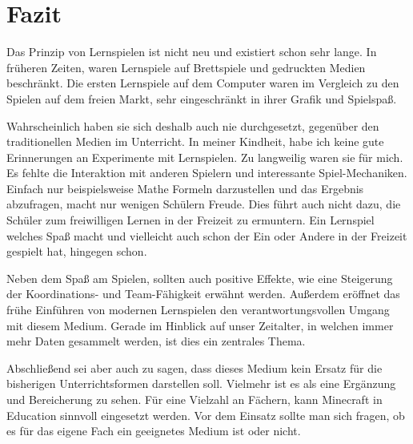 \section{Fazit}
Das Prinzip von Lernspielen ist nicht neu und existiert schon sehr lange. In früheren Zeiten, waren Lernspiele auf Brettspiele und gedruckten Medien beschränkt. Die ersten Lernspiele auf dem Computer waren im Vergleich zu den Spielen auf dem freien Markt, sehr eingeschränkt in ihrer Grafik und Spielspaß. 

Wahrscheinlich haben sie sich deshalb auch nie durchgesetzt, gegenüber den traditionellen Medien im Unterricht.
In meiner Kindheit, habe ich keine gute Erinnerungen an Experimente mit Lernspielen. Zu langweilig waren sie für mich. Es fehlte die Interaktion mit anderen Spielern und interessante Spiel-Mechaniken. Einfach nur beispielsweise Mathe Formeln darzustellen und das Ergebnis abzufragen, macht nur wenigen Schülern Freude. Dies führt auch nicht dazu, die Schüler zum freiwilligen Lernen in der Freizeit zu ermuntern. Ein Lernspiel welches Spaß macht und vielleicht auch schon der Ein oder Andere in der Freizeit gespielt hat, hingegen schon.

Neben dem Spaß am Spielen, sollten auch positive Effekte, wie eine Steigerung der Koordinations- und Team-Fähigkeit erwähnt werden. Außerdem eröffnet das frühe Einführen von modernen Lernspielen den verantwortungsvollen Umgang mit diesem Medium. Gerade im Hinblick auf unser Zeitalter, in welchen immer mehr Daten gesammelt werden, ist dies ein zentrales Thema.

Abschließend sei aber auch zu sagen, dass dieses Medium kein Ersatz für die bisherigen Unterrichtsformen darstellen soll. Vielmehr ist es als eine Ergänzung und Bereicherung zu sehen. Für eine Vielzahl an Fächern, kann Minecraft in Education sinnvoll eingesetzt werden. Vor dem Einsatz sollte man sich fragen, ob es für das eigene Fach ein geeignetes Medium ist oder nicht.